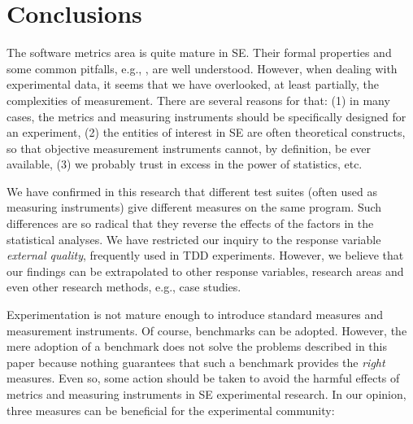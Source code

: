 \section{Conclusions}\label{sec:conclusions}

The software metrics area is quite mature in SE. Their formal properties \cite{fenton2014software} and some common pitfalls, e.g., \cite{fenton1992software}, are well understood. However, when dealing with experimental data, it seems that we have overlooked, at least partially, the complexities of measurement. There are several reasons for that: (1) in many cases, the metrics and measuring instruments should be specifically designed for an experiment, (2) the entities of interest in SE are often theoretical constructs, so that objective measurement instruments cannot, by definition, be ever available, (3) we probably trust in excess in the power of statistics, etc.

We have confirmed in this research that different test suites (often used as measuring instruments) give different measures on the same program. Such differences are so radical that they reverse the effects of the factors in the statistical analyses. We have restricted our inquiry to the response variable \textit{external quality}, frequently used in TDD experiments. However, we believe that our findings can be extrapolated to other response variables, research areas and even other research methods, e.g., case studies.

Experimentation is not mature enough to introduce standard measures and measurement instruments. Of course, benchmarks can be adopted. However, the mere adoption of a benchmark does not solve the problems described in this paper because nothing guarantees that such a benchmark provides the \textit{right} measures. Even so, some action should be taken to avoid the harmful effects of metrics and measuring instruments in SE experimental research. In our opinion, three measures can be beneficial for the experimental community:

